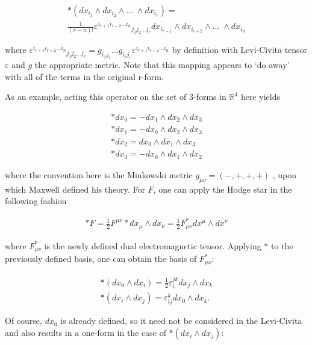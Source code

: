 \documentclass[fleqn, twocolumn, 10pt]{article}
\begin{document}
\begin{ceqn}
\begin{align*}
\ast (dx_{i_1} \land dx_{i_2} \land ...\; \land dx_{i_r}) =\;\;\;\;\;\;\;\;\;\;\;\;\;\;\;\;\;\\ \frac{1}{(r-n)!}\varepsilon^{i_{r+1}i_{r+2}...i_{n}}{}_{j_1j_2...j_r} dx_{i_{r+1}} \land dx_{i_{r+2}} \land ...\; \land dx_{i_n}
\end{align*}
\end{ceqn}
where $\varepsilon^{i_{r+1}i_{r+2}...i_{n}}{}_{j_1j_2...j_r} = g_{i_1j_1}...g_{i_rj_r}\varepsilon^{i_{r+1}i_{r+2}...i_{n}}$ by definition with Levi-Civita tensor $\varepsilon$ and $g$ the appropriate metric. Note that this mapping appears to `do away' with all of the terms in the original r-form. 

As an example, acting this operator on the set of 3-forms in $\mathbb{R}^4$ here yields

\begin{ceqn}
\begin{align*}
\ast dx_0 = -dx_1 \land dx_2 \land dx_3\\
\ast dx_1 = -dx_0 \land dx_2 \land dx_3 \\
\ast dx_2 = dx_0\land dx_1 \land dx_3 \\
\ast dx_3 = -dx_0\land dx_1 \land dx_2
\end{align*}
\end{ceqn}
where the convention here is the Minkowski metric $g_{\mu\nu} = (-,+,+,+)$ \cite{shnir}, upon which Maxwell defined his theory. For $F$, one can apply the Hodge star in the following fashion

\begin{ceqn}
\begin{align*}
\ast F = \frac{1}{2}F^{\mu\nu}\ast dx_\mu \land dx_\nu = \frac{1}{2}F^*_{\mu\nu} dx^\mu \land dx^\nu
\end{align*}
\end{ceqn}
where $F^*_{\mu\nu}$ is the newly defined dual electromagnetic tensor. Applying $\ast$ to the previously defined basis, one can obtain the basis of $F^*_{\mu\nu}$:

\begin{ceqn} 
\begin{equation}\tag{5}
\begin{aligned} 
\ast (dx_0 \land dx_i) = \frac{1}{2}\varepsilon^{jk}_idx_j \land dx_k\\
\ast (dx_i \land dx_j) = \varepsilon^k_{ij}dx_0 \land dx_k.
\end{aligned}
\end{equation}
\end{ceqn}
Of course, $dx_0$ is already defined, so it need not be considered in the Levi-Civita and also results in a one-form in the case of $\ast (dx_i \land dx_j)$:
\end{document}
